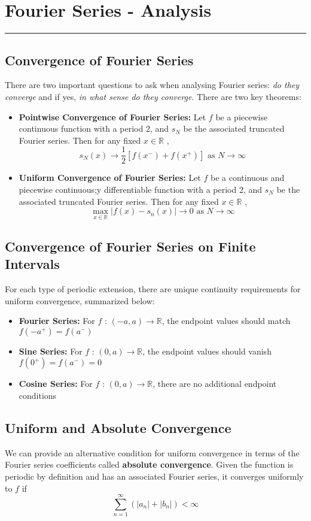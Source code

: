 \documentclass[11pt]{article}
\newcommand{\R}{\mathbb{R}}
\begin{document}
\section{Fourier Series - Analysis}
\hrule \vspace{15pt}

\subsection{Convergence of Fourier Series}
There are two important questions to ask when analysing Fourier series: \textit{do they converge} and if yes, \textit{in what sense do they converge}. There are two key theorems:
\begin{itemize}
\item \textbf{Pointwise Convergence of Fourier Series:} Let $f$ be a piecewise continuous function
with a period 2, and $s_N$ be the associated truncated Fourier series. Then for any fixed $x \in \R$ ,
$$ s_N(x) \rightarrow \frac{1}{2} \left[ f(x^-)+f(x^+)\right] \text{  as  } N \rightarrow \infty$$
\item \textbf{Uniform Convergence of Fourier Series:} Let $f$ be a continuous and piecewise continuous;y differentiable function
with a period 2, and $s_N$ be the associated truncated Fourier series. Then for any fixed $x \in \R$ ,
$$ \max_{x \in \R} |f(x) - s_n(x)| \rightarrow 0 \text{  as  } N \rightarrow \infty$$
\end{itemize}
\subsection{Convergence of Fourier Series on Finite Intervals}
For each type of periodic extension, there are unique continuity requirements for uniform convergence, summarized below:
\begin{itemize}
\item \textbf{Fourier Series:} For $f$ : $(-a,a)\rightarrow \R$, the endpoint values should match $f(-a^+) = f(a^-)$
\item \textbf{Sine Series:} For $f$ : $(0,a)\rightarrow \R$, the endpoint values should vanish $f(0^+) = f(a^-)=0$
\item \textbf{Cosine Series:} For $f$ : $(0,a)\rightarrow \R$, there are no additional endpoint conditions
\end{itemize}
\subsection{Uniform and Absolute Convergence}
We can provide an alternative condition for uniform convergence in terms of the Fourier series coefficients called \textbf{absolute convergence}. Given the function is periodic by definition and has an associated Fourier series, it converges uniformly to $f$ if
$$ \sum_{n=1}^{\infty} \left( |a_n| + |b_n| \right) < \infty $$
\end{document}
